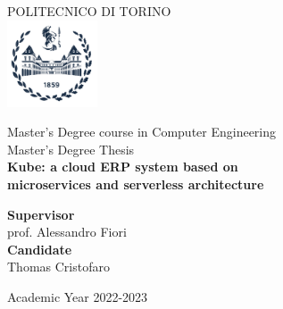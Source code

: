 \begin{titlepage}

    \begin{center}

        {\huge POLITECNICO DI TORINO}\\[1.5cm]
        \includegraphics[width=0.2\textwidth]{./Pictures/logo_polito_2021.jpg}
        \vspace{1cm}

        {\large Master’s Degree course in Computer Engineering}\\[1.5cm]
        {\Large Master’s Degree Thesis}\\[1cm]
        \textbf{\LARGE Kube: a cloud ERP system based on\\microservices and serverless architecture}\\[2cm]
        \vspace{4cm}


        \begin{minipage}{0.85\textwidth}
            \begin{flushleft}\large
                \textbf{Supervisor}\\
                prof. Alessandro Fiori\\
                \hfill \textbf{Candidate}\\
                \hfill Thomas Cristofaro
            \end{flushleft}
        \end{minipage}

        \vfill

        Academic Year 2022-2023
    \end{center}

    \restoregeometry %

\end{titlepage}